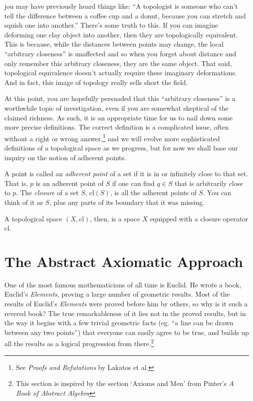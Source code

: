 \documentclass{report}
\newcommand{\cl}{\mathrm{cl}}
\begin{document}
jou may have previously heard things like: ``A topologist is someone who can't tell the difference between a coffee cup and a donut, because you can stretch and squish one into another.'' There's some truth to this. If you can imagine deforming one clay object into another, then they are topologically equivalent. This is because, while the distances between points may change, the local ``arbitrary closeness'' is unaffected and so when you forget about distance and only remember this arbitrary closeness, they are the same object. That said, topological equivalence doesn't actually require these imaginary deformations. And in fact, this image of topology really sells short the field.

At this point, you are hopefully persuaded that this ``arbitrary closeness'' is a worthwhile topic of investigation, even if you are somewhat skeptical of the claimed richness. As such, it is an appropriate time for us to nail down some more precise definitions. The correct definition is a complicated issue, often without a right or wrong answer,\footnote{See \emph{Proofs and Refutations} by Lakatos et al.} and we will evolve more sophisticated definitions of a topological space as we progress, but for now we shall base our inquiry on the notion of adherent points.

A point is called an \emph{adherent point} of a set if it is in or infinitely close to that set. That is, $p$ is an adherent point of $S$ if one can find $q ∈ S$ that is arbitrarily close to $p$. The \emph{closure} of a set $S$, $\cl(S)$, is all the adherent points of $S$. You can think of it as $S$, plus any parts of its boundary that it was missing.

A topological space $(X, \cl)$, then, is a space $X$ equipped with a closure operator $\cl$.

\section{The Abstract Axiomatic Approach}

One of the most famous mathematicians of all time is Euclid. He wrote a book, Euclid's \emph{Elements}, proving a large number of geometric results. Most of the results of Euclid's \emph{Elements} were proved before him by others, so why is it such a revered book? The true remarkableness of it lies not in the proved results, but in the way it begins with a few trivial geometric facts (eg. ``a line can be drawn between any two points'') that everyone can easily agree to be true, and builds up all the results as a logical progression from there.\footnote{This section is inspired by the section `Axioms and Men' from Pinter's \emph{A Book of Abstract Algebra}}
\end{document}
